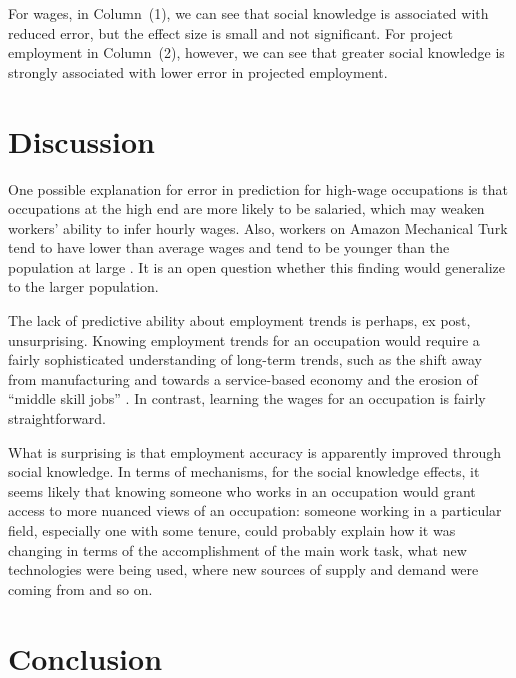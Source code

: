 \documentclass[12pt]{article}
\begin{document}
For wages, in Column~(1), we can see that social knowledge is associated with reduced error, but the effect size is small and not significant. 
For project employment in Column~(2), however, we can see that greater social knowledge is strongly associated with lower error in projected employment.  

\section{Discussion}

One possible explanation for error in prediction for high-wage occupations is that occupations at the high end are more likely to be salaried, which may weaken workers' ability to infer hourly wages. 
Also, workers on Amazon Mechanical Turk tend to have lower than average wages and tend to be younger than the population at large \citep{ipeirotis2010demographics}. 
It is an open question whether this finding would generalize to the larger population. 

The lack of predictive ability about employment trends is perhaps, ex post, unsurprising. 
Knowing employment trends for an occupation would require a fairly sophisticated understanding of long-term trends, such as the shift away from manufacturing and towards a service-based economy and the erosion of ``middle skill jobs'' \citep{autor1998computing}.  
In contrast, learning the wages for an occupation is fairly straightforward. 

What is surprising is that employment accuracy is apparently improved through social knowledge. 
In terms of mechanisms, for the social knowledge effects, it seems likely that knowing someone who works in an occupation would grant access to more nuanced views of an occupation:
someone working in a particular field, especially one with some tenure, could probably explain how it was changing in terms of the accomplishment of the main work task, what new technologies were being used, where new sources of supply and demand were coming from and so on.  

\section{Conclusion} 
\end{document}
